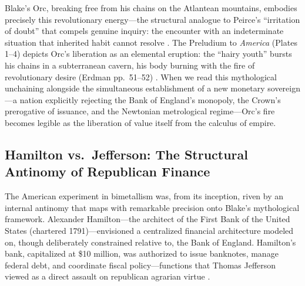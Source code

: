 \documentclass[
]{article}
\begin{document}
Blake's Orc, breaking free from his chains on the Atlantean mountains,
embodies precisely this revolutionary energy---the structural analogue
to Peirce's ``irritation of doubt'' that compels genuine inquiry: the
encounter with an indeterminate situation that inherited habit cannot
resolve \citep{friedman2026blake}. The Preludium to \emph{America}
(Plates 1--4) depicts Orc's liberation as an elemental eruption: the
``hairy youth'' bursts his chains in a subterranean cavern, his body
burning with the fire of revolutionary desire (Erdman pp.~51--52)
\citep{erdman1988complete}. When we read this mythological unchaining
alongside the simultaneous establishment of a new monetary sovereign---a
nation explicitly rejecting the Bank of England's monopoly, the Crown's
prerogative of issuance, and the Newtonian metrological regime---Orc's
fire becomes legible as the liberation of value itself from the calculus
of empire.

\subsection{Hamilton vs.~Jefferson: The Structural Antinomy of
Republican
Finance}\label{hamilton-vs.-jefferson-the-structural-antinomy-of-republican-finance}

The American experiment in bimetallism was, from its inception, riven by
an internal antinomy that maps with remarkable precision onto Blake's
mythological framework. Alexander Hamilton---the architect of the First
Bank of the United States (chartered 1791)---envisioned a centralized
financial architecture modeled on, though deliberately constrained
relative to, the Bank of England. Hamilton's bank, capitalized at \$10
million, was authorized to issue banknotes, manage federal debt, and
coordinate fiscal policy---functions that Thomas Jefferson viewed as a
direct assault on republican agrarian virtue
\citep{laughlin1898bimetallism, wilentz2005rise}.
\end{document}
